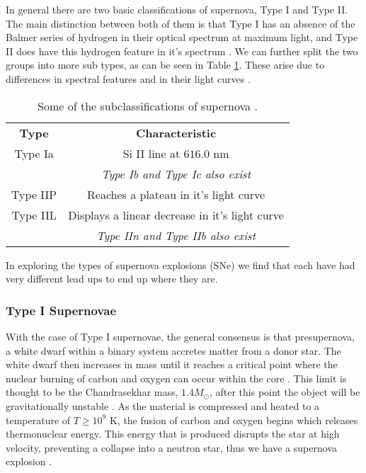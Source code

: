 \documentclass[twocolumn]{revtex4}
\begin{document}
In general there are two basic classifications of supernova, Type I and Type II. The main distinction between both of them is that Type I has an absence of the Balmer series of hydrogen in their optical spectrum at maximum light, and Type II does have this hydrogen feature in it's spectrum \cite{mod_ast, longair}. We can further split the two groups into more sub types, as can be seen in Table \ref{sn_classes}. These arise due to differences in spectral features and in their light curves \cite{longair}.

\begin{table}[h!]
\centering
\begin{tabular}{c@{\hskip 20pt}c} 
 \hline
 \textbf{Type} & \textbf{Characteristic} \\ 
 Type Ia		& Si II line at $616.0$ nm \\
 			& \em Type Ib and Type Ic also exist \em \\
 Type IIP 		& Reaches a plateau in it's light curve \\
 Type IIL		& Displays a linear decrease in it's light curve \\
 			& \em Type IIn and Type IIb also exist \em \\
 \hline
\end{tabular}
\caption{Some of the subclassifications of supernova \cite{longair}.}
\label{sn_classes}
\end{table}

In exploring the types of supernova explosions (SNe) we find that each have had very different lead ups to end up where they are. 

\vspace{-3ex}
\subsubsection{Type I Supernovae}
\vspace{-2ex}
With the case of Type I supernovae, the general consensus is that presupernova, a white dwarf within a binary system accretes matter from a donor star. The white dwarf then increases in mass until it reaches a critical point where the nuclear burning of carbon and oxygen can occur within the core \cite{posn, longair}. This limit is thought to be the Chandrasekhar mass, $1.4 M_{\odot}$, after this point the object will be gravitationally unstable \cite{longair}. As the material is compressed and heated to a temperature of $T \geq 10^9$ K, the fusion of carbon and oxygen begins which releases thermonuclear energy. This energy that is produced disrupts the star at high velocity, preventing a collapse into a neutron star, thus we have a supernova explosion \cite{posn}.
\end{document}
